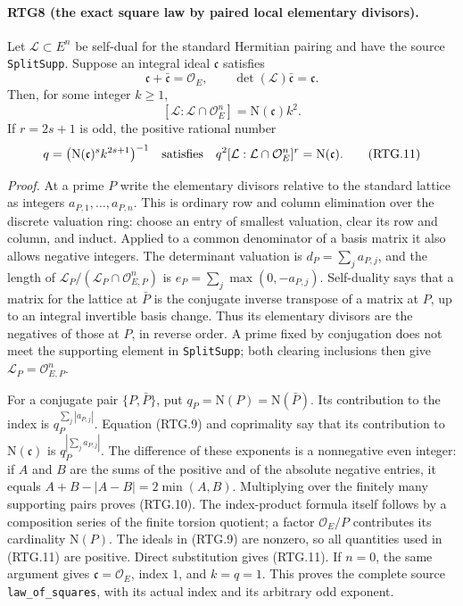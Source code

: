 \paragraph{RTG8 (the exact square law by paired local elementary divisors).}
\label{claim:RTG8}
Let $\mathcal L\subset E^n$ be self-dual for the standard Hermitian
pairing and have the source \texttt{SplitSupp}.  Suppose an integral
ideal $\mathfrak c$ satisfies
\[
 \mathfrak c+\bar{\mathfrak c}=\mathcal O_E,\qquad
 \det(\mathcal L)\bar{\mathfrak c}=\mathfrak c.
                                                               \tag{RTG.9}
\]
Then, for some integer $k\ge1$,
\[
 [\mathcal L:\mathcal L\cap\mathcal O_E^n]
       =\mathrm N(\mathfrak c)k^2.                            \tag{RTG.10}
\]
If $r=2s+1$ is odd, the positive rational number
\[
 q=\bigl(\mathrm N(\mathfrak c)^s k^{2s+1}\bigr)^{-1}
 \quad\hbox{satisfies}\quad
 q^2[\mathcal L:\mathcal L\cap\mathcal O_E^n]^r
       =\mathrm N(\mathfrak c).                             \tag{RTG.11}
\]

\emph{Proof.}
At a prime $P$ write the elementary divisors relative to the standard
lattice as integers $a_{P,1},\ldots,a_{P,n}$.  This is ordinary row and
column elimination over the discrete valuation ring: choose an entry
of smallest valuation, clear its row and column, and induct.  Applied
to a common denominator of a basis matrix it also allows negative
integers.  The determinant valuation is $d_P=\sum_j a_{P,j}$,
and the length of
$\mathcal L_P/(\mathcal L_P\cap\mathcal O_{E,P}^n)$ is
$e_P=\sum_j\max(0,-a_{P,j})$.
Self-duality says that a matrix for the lattice at $\bar P$ is the
conjugate inverse transpose of a matrix at $P$, up to an integral
invertible basis change.  Thus its elementary divisors are the negatives
of those at $P$, in reverse order.  A prime fixed by conjugation does
not meet the supporting element in \texttt{SplitSupp}; both clearing
inclusions then give $\mathcal L_P=\mathcal O_{E,P}^n$.

For a conjugate pair $\{P,\bar P\}$, put $q_P=\mathrm N(P)=\mathrm
N(\bar P)$.  Its contribution to the index is
$q_P^{\sum_j|a_{P,j}|}$.  Equation (RTG.9) and coprimality say that its
contribution to $\mathrm N(\mathfrak c)$ is
$q_P^{|\sum_j a_{P,j}|}$.  The difference of these exponents is a
nonnegative even integer: if $A$ and $B$ are the sums of the positive
and of the absolute negative entries, it equals
$A+B-|A-B|=2\min(A,B)$.  Multiplying over the finitely many supporting
pairs proves (RTG.10).  The index-product formula itself follows by a
composition series of the finite torsion quotient; a factor
$\mathcal O_E/P$ contributes its cardinality $\mathrm N(P)$.
The ideals in (RTG.9) are nonzero, so all quantities used in (RTG.11)
are positive.  Direct substitution gives (RTG.11).  If $n=0$, the
same argument gives $\mathfrak c=\mathcal O_E$, index $1$, and $k=q=1$.
This proves the complete source \texttt{law\_\allowbreak of\_\allowbreak squares}, with its
actual index and its arbitrary odd exponent.


